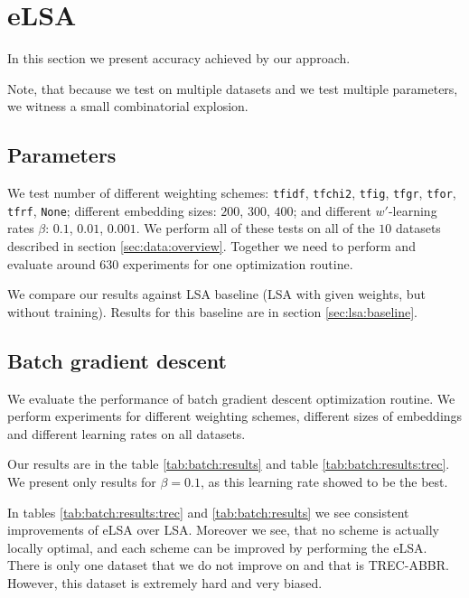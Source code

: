 \section{eLSA}
    
    In this section we present accuracy achieved by our approach.
    
    Note, that because we test on multiple datasets and we test multiple parameters, we witness a small combinatorial explosion.

    \subsection{Parameters}
    \* %
    We test number of different weighting schemes: \texttt{tfidf}, \texttt{tfchi2}, \texttt{tfig}, \texttt{tfgr}, \texttt{tfor}, \texttt{tfrf}, \texttt{None};
    different embedding sizes: $200$, $300$, $400$;
    and different $w'$-learning rates $\beta$: $0.1$, $0.01$, $0.001$.
    We perform all of these tests on all of the $10$ datasets described in section \ref{sec:data:overview}.
    Together we need to perform and evaluate around $630$ experiments for one optimization routine.
    
    We compare our results against LSA baseline (LSA with given weights, but without training).
    Results for this baseline are in section \ref{sec:lsa:baseline}.
    
    \subsection{Batch gradient descent}
    We evaluate the performance of batch gradient descent optimization routine.
    We perform experiments for different weighting schemes, different sizes of embeddings and different learning rates on all datasets.

    Our results are in the table \ref{tab:batch:results} and table \ref{tab:batch:results:trec}.
    We present only results for $\beta=0.1$, as this learning rate showed to be the best. 
    
    

    In tables \ref{tab:batch:results:trec} and \ref{tab:batch:results} we see consistent improvements of eLSA over LSA.
    Moreover we see, that no scheme is actually locally optimal, and each scheme can be improved by performing the eLSA.
    There is only one dataset that we do not improve on and that is TREC-ABBR.
    However, this dataset is extremely hard and very biased. 
    
